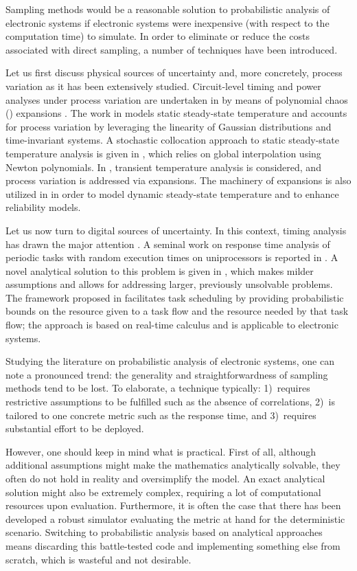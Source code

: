 Sampling methods would be a reasonable solution to probabilistic analysis of
electronic systems if electronic systems were inexpensive (with respect to the
computation time) to simulate. In order to eliminate or reduce the costs
associated with direct sampling, a number of techniques have been introduced.

Let us first discuss physical sources of uncertainty and, more concretely,
process variation as it has been extensively studied. Circuit-level timing and
power analyses under process variation are undertaken in \cite{bhardwaj2008} by
means of polynomial chaos () expansions \cite{xiu2010}. The work in
\cite{juan2012} models static steady-state temperature and accounts for process
variation by leveraging the linearity of Gaussian distributions and
time-invariant systems. A stochastic collocation \cite{xiu2010} approach to
static steady-state temperature analysis is given in \cite{lee2013}, which
relies on global interpolation using Newton polynomials. In \cite{ukhov2014},
transient temperature analysis is considered, and process variation is addressed
via  expansions. The machinery of  expansions is also utilized in
\cite{ukhov2015} in order to model dynamic steady-state temperature
\cite{ukhov2012} and to enhance reliability models.

Let us now turn to digital sources of uncertainty. In this context, timing
analysis has drawn the major attention \cite{quinton2012}. A seminal work on
response time analysis of periodic tasks with random execution times on
uniprocessors is reported in \cite{diaz2002}. A novel analytical solution to
this problem is given in \cite{tanasa2015}, which makes milder assumptions and
allows for addressing larger, previously unsolvable problems. The framework
proposed in \cite{santinelli2011} facilitates task scheduling by providing
probabilistic bounds on the resource given to a task flow and the resource
needed by that task flow; the approach is based on real-time calculus and is
applicable to electronic systems.

Studying the literature on probabilistic analysis of electronic systems, one can
note a pronounced trend: the generality and straightforwardness of sampling
methods tend to be lost. To elaborate, a technique typically: 1)~requires
restrictive assumptions to be fulfilled such as the absence of correlations,
2)~is tailored to one concrete metric such as the response time, and 3)~requires
substantial effort to be deployed.

However, one should keep in mind what is practical. First of all, although
additional assumptions might make the mathematics analytically solvable, they
often do not hold in reality and oversimplify the model. An exact analytical
solution might also be extremely complex, requiring a lot of computational
resources upon evaluation. Furthermore, it is often the case that there has been
developed a robust simulator evaluating the metric at hand for the deterministic
scenario. Switching to probabilistic analysis based on analytical approaches
means discarding this battle-tested code and implementing something else from
scratch, which is wasteful and not desirable.

